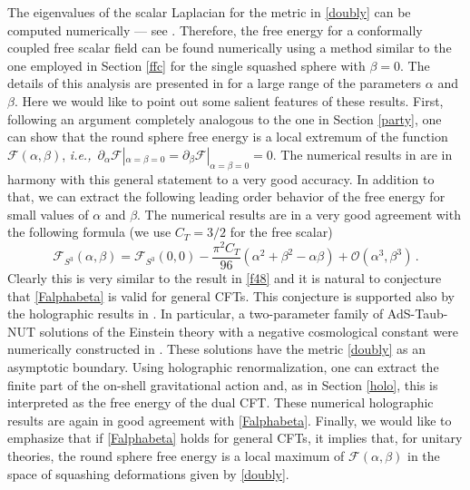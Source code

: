 \documentclass[12pt]{article}
\numberwithin{equation}{section}
\newcommand{\labell}[1]{\label{#1}}
\newcommand{\ssc}{\scriptscriptstyle}
\newcommand{\ie}{{\it i.e.,}\ }
\newcommand{\ctt}{C_{\ssc T}}
\begin{document}
The eigenvalues of the scalar Laplacian for the metric in \eqref{doubly} can be computed numerically --- see \cite{PhysRevD.8.1048, Bobev:2016sap}. Therefore, the free energy for a conformally coupled free scalar field can be found numerically using a method similar to the one employed in Section \ref{ffc} for the single squashed sphere with $\beta=0$. The details of this analysis are presented in \cite{Bobev:2016sap} for a large range of the parameters $\alpha$ and $\beta$. Here we would like to point out some salient features of these results. First, following an argument completely analogous to the one in Section \ref{party}, one can show that the round sphere free energy is a local extremum of the function $\mathcal{F}(\alpha,\beta)$, \ie $\partial_{\alpha}\mathcal{F}|_{\alpha=\beta=0}=\partial_{\beta}\mathcal{F}|_{\alpha=\beta=0}=0$. The  numerical results in \cite{Bobev:2016sap} are in harmony with this general statement to a very good accuracy. In addition to that, we can extract the following leading order behavior of the free energy for small values of $\alpha$ and $\beta$. The numerical results are in a very good agreement with the following formula (we use $\ctt=3/2$ for the free scalar)
%
\begin{equation}\labell{Falphabeta}
\mathcal{F}_{S^{3}}(\alpha,\beta)=\mathcal{F}_{S^{3}}(0,0)-\frac{\pi^2\ctt}{96}(\alpha^2+\beta^2-\alpha\beta)+\mathcal{O}\left(\alpha^3,\beta^3\right)\,.
\end{equation}
%
Clearly this is very similar to the result in \eqref{f48} and it is natural to conjecture that \eqref{Falphabeta} is valid for general CFTs. This conjecture is supported also by the holographic results in \cite{Bobev:2016sap}. In particular, a two-parameter family of AdS-Taub-NUT solutions of the Einstein theory with a negative cosmological constant were numerically constructed in \cite{Bobev:2016sap}. These solutions have the metric \eqref{doubly} as an asymptotic boundary. Using holographic renormalization, one can extract the finite part of the on-shell gravitational action and, as in Section \ref{holo}, this is interpreted as the free energy of the dual CFT. These numerical holographic results  are again in good agreement with \eqref{Falphabeta}. Finally, we would like to emphasize that if \eqref{Falphabeta} holds for general CFTs, it implies that, for unitary theories, the round sphere free energy is a local maximum of $\mathcal{F}(\alpha,\beta)$ in the space of squashing deformations given by \eqref{doubly}.
\end{document}
